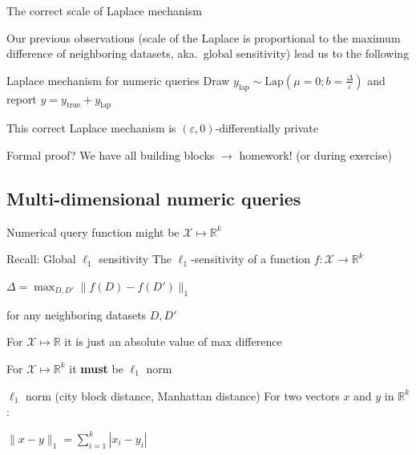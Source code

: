 \documentclass[12pt,aspectratio=169,handout]{beamer}
\begin{document}
\begin{frame}{The correct scale of Laplace mechanism}

Our previous observations (scale of the Laplace is proportional to the maximum difference of neighboring datasets, aka.\ global sensitivity) lead us to the following

\begin{block}{Laplace mechanism for numeric queries}
Draw $y_{\mathrm{lap}} \sim \textrm{Lap}(\mu = 0; b=\frac{\Delta}{\varepsilon})$ and report $y = y_{\mathrm{true}} + y_{\mathrm{lap}}$
\end{block}

This correct Laplace mechanism is $(\varepsilon, 0)$-differentially private

Formal proof? We have all building blocks $\rightarrow$ homework! (or during exercise)

\end{frame}


\subsection{Multi-dimensional numeric queries}

\begin{frame}{Numerical query function might be $\mathcal{X} \mapsto \mathbb{R}^k$}

\begin{block}{Recall: Global $\ell_1$ sensitivity}
The $\ell_1$-sensitivity of a function $f : \mathcal{X} \rightarrow \mathbb{R}^k$

$\Delta = \max_{D, D'} \| f(D) - f(D') \|_1$

for any neighboring datasets $D, D'$
\end{block}

For $\mathcal{X} \mapsto \mathbb{R}$ it is just an absolute value of max difference

For $\mathcal{X} \mapsto \mathbb{R}^k$ it \textbf{must} be $\ell_1$ norm

\begin{block}{$\ell_1$ norm (city block distance, Manhattan distance)}
For two vectors $x$ and $y$ in $\mathbb{R}^k$:

$\| x - y\|_1 = \sum_{i = 1}^{k} | x_i - y_i |$
\end{block}

\end{frame}
\end{document}
